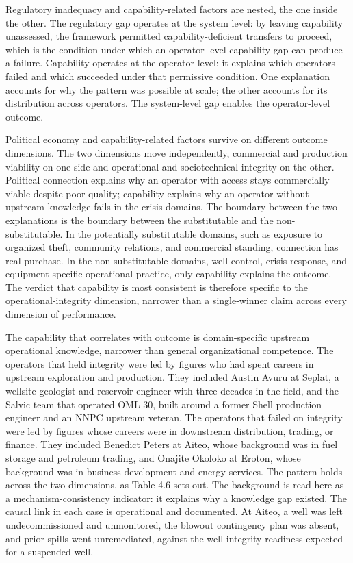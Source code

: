 \documentclass[twoside,fontset=lmodern]{mitthesis}
\begin{document}
Regulatory inadequacy and capability-related factors are nested, the one
inside the other. The regulatory gap operates at the system level: by
leaving capability unassessed, the framework permitted
capability-deficient transfers to proceed, which is the condition under
which an operator-level capability gap can produce a failure. Capability
operates at the operator level: it explains which operators failed and
which succeeded under that permissive condition. One explanation
accounts for why the pattern was possible at scale; the other accounts
for its distribution across operators. The system-level gap enables the
operator-level outcome.

Political economy and capability-related factors survive on different
outcome dimensions. The two dimensions move independently, commercial
and production viability on one side and operational and sociotechnical
integrity on the other. Political connection explains why an operator
with access stays commercially viable despite poor quality; capability
explains why an operator without upstream knowledge fails in the crisis
domains. The boundary between the two explanations is the boundary
between the substitutable and the non-substitutable. In the potentially
substitutable domains, such as exposure to organized theft, community
relations, and commercial standing, connection has real purchase. In the
non-substitutable domains, well control, crisis response, and
equipment-specific operational practice, only capability explains the
outcome. The verdict that capability is most consistent is therefore
specific to the operational-integrity dimension, narrower than a
single-winner claim across every dimension of performance.

The capability that correlates with outcome is domain-specific upstream
operational knowledge, narrower than general organizational competence.
The operators that held integrity were led by figures who had spent
careers in upstream exploration and production. They included Austin
Avuru at Seplat, a wellsite geologist and reservoir engineer with three
decades in the field, and the Salvic team that operated OML 30, built
around a former Shell production engineer and an NNPC upstream veteran.
The operators that failed on integrity were led by figures whose careers
were in downstream distribution, trading, or finance. They included
Benedict Peters at Aiteo, whose background was in fuel storage and
petroleum trading, and Onajite Okoloko at Eroton, whose background was
in business development and energy services. The pattern holds across
the two dimensions, as Table 4.6 sets out. The background is read here
as a mechanism-consistency indicator: it explains why a knowledge gap
existed. The causal link in each case is operational and documented. At
Aiteo, a well was left undecommissioned and unmonitored, the blowout
contingency plan was absent, and prior spills went unremediated, against
the well-integrity readiness expected for a suspended well.
\end{document}

